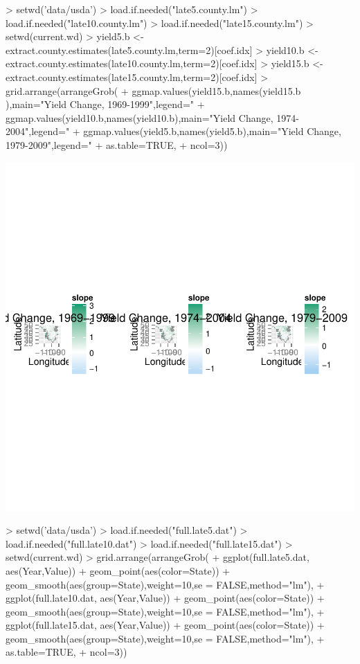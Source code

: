 \documentclass{report}
\begin{document}
\begin{Schunk}
\begin{Sinput}
> setwd('data/usda')
> load.if.needed("late5.county.lm")
> load.if.needed("late10.county.lm")
> load.if.needed("late15.county.lm")
> setwd(current.wd)
> yield5.b <- extract.county.estimates(late5.county.lm,term=2)[coef.idx]
> yield10.b <- extract.county.estimates(late10.county.lm,term=2)[coef.idx]
> yield15.b <- extract.county.estimates(late15.county.lm,term=2)[coef.idx]
> grid.arrange(arrangeGrob(
+    ggmap.values(yield15.b,names(yield15.b ),main="Yield Change, 1969-1999",legend="%
+    ggmap.values(yield10.b,names(yield10.b),main="Yield Change, 1974-2004",legend="%
+    ggmap.values(yield5.b,names(yield5.b),main="Yield Change, 1979-2009",legend="%
+    as.table=TRUE,
+    ncol=3))
\end{Sinput}
\end{Schunk}
\includegraphics{WheatYields-095}


\begin{Schunk}
\begin{Sinput}
> setwd('data/usda')
> load.if.needed("full.late5.dat")
> load.if.needed("full.late10.dat")
> load.if.needed("full.late15.dat")
> setwd(current.wd)
> grid.arrange(arrangeGrob(
+   ggplot(full.late5.dat, aes(Year,Value)) + geom_point(aes(color=State)) + geom_smooth(aes(group=State),weight=10,se = FALSE,method="lm"),
+   ggplot(full.late10.dat, aes(Year,Value)) + geom_point(aes(color=State)) + geom_smooth(aes(group=State),weight=10,se = FALSE,method="lm"),
+   ggplot(full.late15.dat, aes(Year,Value)) + geom_point(aes(color=State)) + geom_smooth(aes(group=State),weight=10,se = FALSE,method="lm"),
+    as.table=TRUE,
+    ncol=3))
\end{Sinput}
\end{Schunk}
\end{document}
